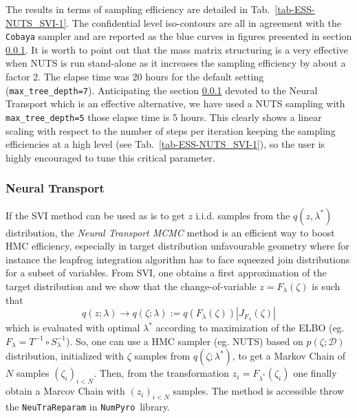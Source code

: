 \documentclass[final,5p,times,twocolumn,authoryear]{elsarticle}
\newcommand{\numpyro}{\texttt{NumPyro}}
\newcommand{\bydef}{:=}
\begin{document}
The results in terms of sampling efficiency are detailed in Tab.~\ref{tab-ESS-NUTS_SVI-1}. The confidential level iso-contours are all in agreement with the \texttt{Cobaya} sampler and are reported as the blue curves in figures presented in section \ref{sec-Neural-Reparametrisation}. It is worth to point out that the mass matrix structuring is a very effective when NUTS is run stand-alone as it increases the sampling efficiency by about a factor 2.  The elapse time was 20 hours for the default setting (\texttt{max\_tree\_depth=7}). Anticipating the section \ref{sec-Neural-Reparametrisation} devoted to the Neural Transport which is an effective alternative, we have used a NUTS sampling with \texttt{max\_tree\_depth=5} those elapse time is 5 hours. This clearly shows a linear scaling with respect to the number of steps per iteration keeping the sampling efficiencies at a high level (see Tab.~\ref{tab-ESS-NUTS_SVI-1}), so the user is highly encouraged to tune this critical parameter. 
 

%
\subsubsection{Neural Transport}
\label{sec-Neural-Reparametrisation}
%
If the SVI method can be used as is to get $z$ i.i.d. samples from the $q(z,\lambda^\ast)$ distribution, the \textit{Neural Transport MCMC} method \citep{2014arXiv1412.5492P,2019arXiv190303704H} is an efficient way to boost HMC efficiency, especially in target distribution unfavourable geometry where for instance the leapfrog integration algorithm has to face squeezed join distributions for a subset of variables. From SVI, one obtains a first approximation of the target distribution and we show that the change-of-variable $z=F_\lambda(\zeta)$ is such that
\begin{equation}
q(z;\lambda) \rightarrow q(\zeta;\lambda) \bydef q(F_\lambda(\zeta)) |J_{F_\lambda}(\zeta)|
\end{equation}
which is evaluated with optimal $\lambda^\ast$ according to maximization of the ELBO (eg. $F_\lambda=T^{-1}\circ S^{-1}_\lambda$). So, one can use a HMC sampler (eg. NUTS) based on $p(\zeta;\mathcal{D})$ distribution, initialized with $\zeta$ samples from $q(\zeta;\lambda^\ast)$, to get a Markov Chain of $N$ samples $(\zeta_i)_{i<N}$. Then, from the transformation  $z_i=F_{\lambda^\ast}(\zeta_i)$ one finally obtain a Marcov Chain with $(z_i)_{i<N}$ samples. The method is accessible throw the \verb|NeuTraReparam| in \numpyro\ library.
\end{document}
